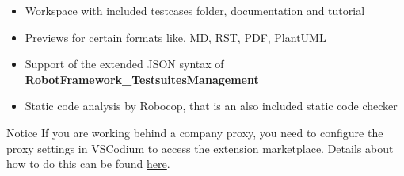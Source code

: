 \begin{itemize}
   \item Workspace with included testcases folder, documentation and tutorial
   \item Previews for certain formats like, MD, RST, PDF, PlantUML
   \item Support of the extended JSON syntax of \textbf{RobotFramework\_TestsuitesManagement}
   \item Static code analysis by Robocop, that is an also included static code checker
\end{itemize}

\begin{boxhint}{Notice}
   If you are working behind a company proxy, you need to configure the proxy settings in VSCodium to access
   the extension marketplace. Details about how to do this can be found
   \hyperref[fw-environment-environment-proxy-configuration]{here}.
\end{boxhint}


